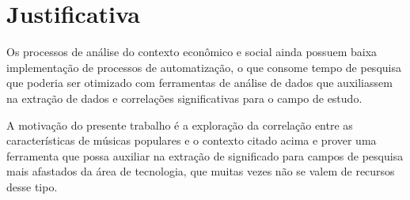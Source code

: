 \section{Justificativa}
\label{c.justificativa}

Os processos de análise do contexto econômico e social ainda possuem baixa implementação de processos de automatização, o que consome tempo de pesquisa que poderia ser otimizado com ferramentas de análise de dados que auxiliassem na extração de dados e correlações significativas para o campo de estudo.

A motivação do presente trabalho é a exploração da correlação entre as características de músicas populares e o contexto citado acima e prover uma ferramenta que possa auxiliar na extração de significado para campos de pesquisa mais afastados da área de tecnologia, que muitas vezes não se valem de recursos desse tipo.